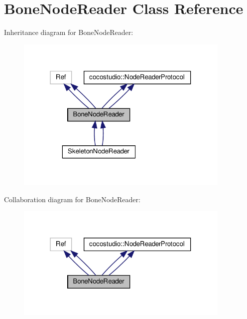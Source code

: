 \hypertarget{classBoneNodeReader}{}\section{Bone\+Node\+Reader Class Reference}
\label{classBoneNodeReader}


Inheritance diagram for Bone\+Node\+Reader\+:
\nopagebreak
\begin{figure}[H]
\begin{center}
\leavevmode
\includegraphics[width=292pt]{classBoneNodeReader__inherit__graph}
\end{center}
\end{figure}


Collaboration diagram for Bone\+Node\+Reader\+:
\nopagebreak
\begin{figure}[H]
\begin{center}
\leavevmode
\includegraphics[width=292pt]{classBoneNodeReader__coll__graph}
\end{center}
\end{figure}
